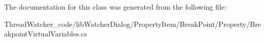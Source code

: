 The documentation for this class was generated from the following file\+:\begin{DoxyCompactItemize}
\item 
Thread\+Watcher\+\_\+code/lib\+Watcher\+Dialog/\+Property\+Item/\+Break\+Point/\+Property/Breakpoint\+Virtual\+Variables.\+cs\end{DoxyCompactItemize}
